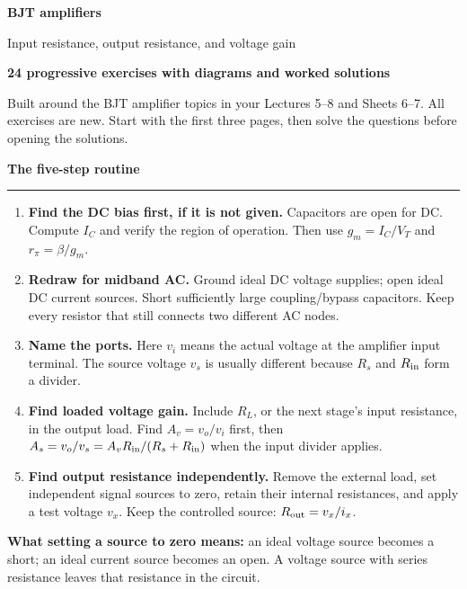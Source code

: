 \documentclass[11pt,a4paper]{article}
\newcommand{\head}[1]{\par{\Large\bfseries\color{ink}#1}\par\vspace{3pt}\hrule\vspace{7pt}}
\begin{document}
{\Huge\bfseries\color{ink}BJT amplifiers}\par
{\LARGE Input resistance, output resistance, and voltage gain}\par
\textbf{24 progressive exercises with diagrams and worked solutions}

Built around the BJT amplifier topics in your Lectures 5--8 and Sheets 6--7. All exercises are new. Start with the first three pages, then solve the questions before opening the solutions.

\head{The five-step routine}
\begin{enumerate}
\item \textbf{Find the DC bias first, if it is not given.} Capacitors are open for DC. Compute $I_C$ and verify the region of operation. Then use $g_m=I_C/V_T$ and $r_\pi=\beta/g_m$.
\item \textbf{Redraw for midband AC.} Ground ideal DC voltage supplies; open ideal DC current sources. Short sufficiently large coupling/bypass capacitors. Keep every resistor that still connects two different AC nodes.
\item \textbf{Name the ports.} Here $v_i$ means the actual voltage at the amplifier input terminal. The source voltage $v_s$ is usually different because $R_s$ and $R_{\rm in}$ form a divider.
\item \textbf{Find loaded voltage gain.} Include $R_L$, or the next stage's input resistance, in the output load. Find $A_v=v_o/v_i$ first, then $A_s=v_o/v_s=A_vR_{\rm in}/(R_s+R_{\rm in})$ when the input divider applies.
\item \textbf{Find output resistance independently.} Remove the external load, set independent signal sources to zero, retain their internal resistances, and apply a test voltage $v_x$. Keep the controlled source: $R_{\rm out}=v_x/i_x$.
\end{enumerate}
\textbf{What setting a source to zero means:} an ideal voltage source becomes a short; an ideal current source becomes an open. A voltage source with series resistance leaves that resistance in the circuit.
\end{document}
